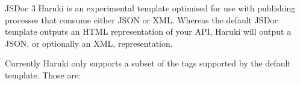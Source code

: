 J\+S\+Doc 3 Haruki is an experimental template optimised for use with publishing processes that consume either J\+S\+ON or X\+ML. Whereas the default J\+S\+Doc template outputs an H\+T\+ML representation of your A\+PI, Haruki will output a J\+S\+ON, or optionally an X\+ML, representation.

Currently Haruki only supports a subset of the tags supported by the default template. Those are\+:


\begin{DoxyItemize}
\item 
\end{DoxyItemize}